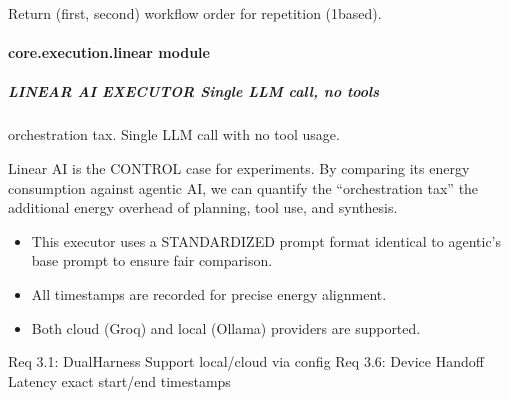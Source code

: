 \documentclass[letterpaper,10pt,english]{sphinxmanual}
\begin{document}

\begin{fulllineitems}
\label{\detokenize{core.execution.harness:core.execution.harness.get_workflow_order}}
\pysigstartsignatures
\pysiglinewithargsret
{}
{}
{}
\pysigstopsignatures
\sphinxAtStartPar
Return (first, second) workflow order for repetition (1\sphinxhyphen{}based).

\end{fulllineitems}


\sphinxstepscope


\paragraph{core.execution.linear module}
\label{\detokenize{core.execution.linear:module-core.execution.linear}}\label{\detokenize{core.execution.linear:core-execution-linear-module}}\label{\detokenize{core.execution.linear::doc}}

\subparagraph{LINEAR AI EXECUTOR \textendash{} Single LLM call, no tools}
\label{\detokenize{core.execution.linear:linear-ai-executor-single-llm-call-no-tools}}\begin{description}
\sphinxAtStartPar
orchestration tax. Single LLM call with no tool usage.

\sphinxAtStartPar
Linear AI is the CONTROL case for experiments. By comparing its energy
consumption against agentic AI, we can quantify the “orchestration tax” \textendash{}
the additional energy overhead of planning, tool use, and synthesis.

\begin{itemize}
\item {} 
\sphinxAtStartPar
This executor uses a STANDARDIZED prompt format identical to agentic’s
base prompt to ensure fair comparison.

\item {} 
\sphinxAtStartPar
All timestamps are recorded for precise energy alignment.

\item {} 
\sphinxAtStartPar
Both cloud (Groq) and local (Ollama) providers are supported.

\end{itemize}

\sphinxAtStartPar
Req 3.1: Dual\sphinxhyphen{}Harness Support \textendash{} local/cloud via config
Req 3.6: Device Handoff Latency \textendash{} exact start/end timestamps

\end{description}
\end{document}
